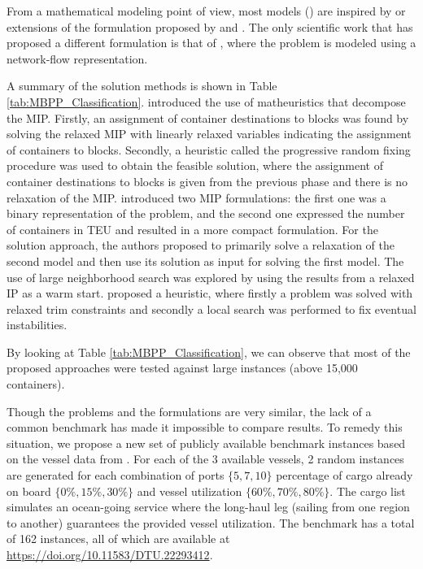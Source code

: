 \documentclass[preprint,12pt,authoryear]{elsarticle}
\begin{document}
From a mathematical modeling point of view, most models (\cite{Pacino2013AnPlanning,Ambrosino2018ShippingApproach, Kebedow2018IncludingProblem, Bilican2020AParameters}) are inspired by or extensions of the formulation proposed by \cite{Ambrosino2004StowingProblem} and \cite{Pacino2011FastVessels}. The only scientific work that has proposed a different formulation is that of \cite{Chao2021}, where the problem is modeled using a network-flow representation. 

A summary of the solution methods is shown in Table \ref{tab:MBPP_Classification}. \cite{Ambrosino2015APlanning, Ambrosino2018ShippingApproach} introduced the use of matheuristics that decompose the MIP. Firstly, an assignment of container destinations to blocks was found by solving the relaxed MIP with linearly relaxed variables indicating the assignment of containers to blocks. Secondly, a heuristic called the progressive random fixing procedure was used to obtain the feasible solution, where the assignment of container destinations to blocks is given from the previous phase and there is no relaxation of the MIP. \cite{Ambrosino2015ComputationalProblems, Ambrosino2015ExperimentalProblem} introduced two MIP formulations: the first one was a binary representation of the problem, and the second one expressed the number of containers in TEU and resulted in a more compact formulation. For the solution approach, the authors proposed to primarily solve a relaxation of the second model and then use its solution as input for solving the first model. The use of large neighborhood search was explored by \cite{Pacino2013AnPlanning} using the results from a relaxed IP as a warm start. \cite{Bilican2020AParameters} proposed a heuristic, where firstly a problem was solved with relaxed trim constraints and secondly a local search was performed to fix eventual instabilities. 

By looking at Table \ref{tab:MBPP_Classification}, we can observe that most of the proposed approaches were tested against large instances (above 15,000 containers). 

Though the problems and the formulations are very similar, the lack of a common benchmark has made it impossible to compare results. To remedy this situation, we propose a new set of publicly available benchmark instances based on the vessel data from \cite{Larsen2021AProblem}. For each of the 3 available vessels, 2 random instances are generated for each combination of ports $\{5,7,10\}$ percentage of cargo already on board $\{0\%,15\%,30\%\}$ and vessel utilization $\{60\%,70\%,80\%\}$. The cargo list simulates an ocean-going service where the long-haul leg (sailing from one region to another) guarantees the provided vessel utilization. The benchmark has a total of 162 instances, all of which are available at \url{https://doi.org/10.11583/DTU.22293412}. 
\end{document}
